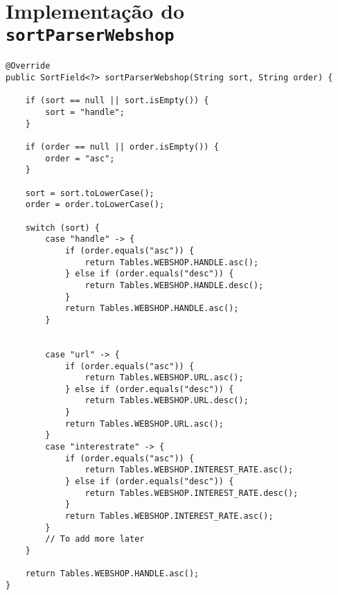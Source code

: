 \chapter{Implementação do \texttt{sortParserWebshop}}\label{an2}

\begin{verbatim}
@Override
public SortField<?> sortParserWebshop(String sort, String order) {

	if (sort == null || sort.isEmpty()) {
		sort = "handle";
	}

	if (order == null || order.isEmpty()) {
		order = "asc";
	}

	sort = sort.toLowerCase();
	order = order.toLowerCase();

	switch (sort) {
		case "handle" -> {
			if (order.equals("asc")) {
				return Tables.WEBSHOP.HANDLE.asc();
			} else if (order.equals("desc")) {
				return Tables.WEBSHOP.HANDLE.desc();
			}
			return Tables.WEBSHOP.HANDLE.asc();
		}

		
		case "url" -> {
			if (order.equals("asc")) {
				return Tables.WEBSHOP.URL.asc();
			} else if (order.equals("desc")) {
				return Tables.WEBSHOP.URL.desc();
			}
			return Tables.WEBSHOP.URL.asc();
		}
		case "interestrate" -> {
			if (order.equals("asc")) {
				return Tables.WEBSHOP.INTEREST_RATE.asc();
			} else if (order.equals("desc")) {
				return Tables.WEBSHOP.INTEREST_RATE.desc();
			}
			return Tables.WEBSHOP.INTEREST_RATE.asc();
		}
		// To add more later
	}

	return Tables.WEBSHOP.HANDLE.asc();
}
\end{verbatim}
